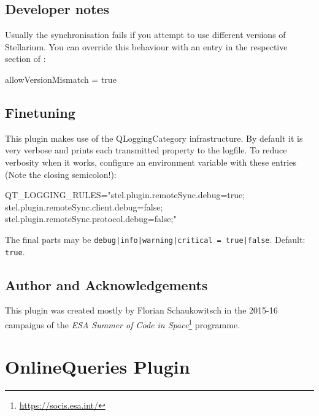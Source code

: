 \subsection{Developer notes}

Usually the synchronisation fails if you attempt to use different
versions of Stellarium. You can override this behaviour
 with an entry in the respective section of
:

\begin{configfile}[\scriptsize]
  [RemoteSync]
  allowVersionMismatch = true
\end{configfile}

\subsection{Finetuning}

This plugin makes use of the QLoggingCategory infrastructure. By default it is very verbose and prints each transmitted property to the logfile.
To reduce verbosity when it works, configure an environment variable with these entries (Note the closing semicolon!):
\begin{commands}[\scriptsize]
QT_LOGGING_RULES="stel.plugin.remoteSync.debug=true;
		  stel.plugin.remoteSync.client.debug=false;
		  stel.plugin.remoteSync.protocol.debug=false;"
\end{commands}

The final parts may be \texttt{debug|info|warning|critical = true|false}. Default: \texttt{true}.


\subsection*{Author and Acknowledgements}

This plugin was created mostly by Florian Schaukowitsch in the 2015-16 campaigns of the 
\emph{ESA Summer of Code in Space}\footnote{\url{https://socis.esa.int/}} programme. 

% 

\newpage
\section{OnlineQueries Plugin}
\label{sec:plugins:OnlineQueries}

